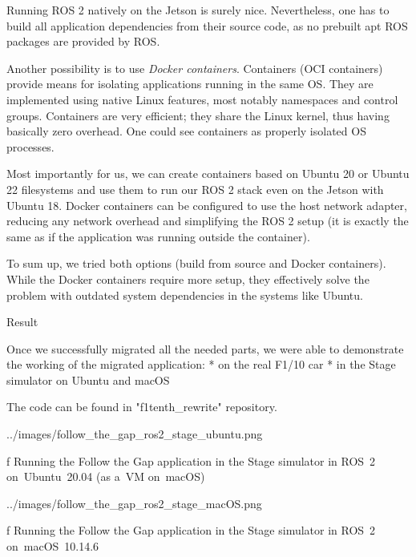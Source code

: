 Running ROS 2 natively on the Jetson is surely nice. Nevertheless, one has to build all application dependencies from their source code, as no prebuilt apt ROS packages are provided by ROS.

Another possibility is to use {\em Docker containers}. Containers (OCI containers) provide means for isolating applications running in the same OS. They are implemented using native Linux features, most notably namespaces and control groups. Containers are very efficient; they share the Linux kernel, thus having basically zero overhead. One could see containers as properly isolated OS processes.

Most importantly for us, we can create containers based on Ubuntu 20 or Ubuntu 22 filesystems and use them to run our ROS 2 stack even on the Jetson with Ubuntu 18. Docker containers can be configured to use the host network adapter, reducing any network overhead and simplifying the ROS 2 setup (it is exactly the same as if the application was running outside the container).

To sum up, we tried both options (build from source and Docker containers). While the Docker containers require more setup, they effectively solve the problem with outdated system dependencies in the systems like Ubuntu.


\sec Result

Once we successfully migrated all the needed parts, we were able to demonstrate the working of the migrated application:
\begitems
* {\sbf on the real F1/10 car}
* in the Stage simulator on Ubuntu and macOS
\enditems

The code can be found in "f1tenth_rewrite" repository.

\midinsert
{}
\picw=14cm \cinspic ../images/follow_the_gap_ros2_stage_ubuntu.png
\caption/f Running the Follow the Gap application in the Stage simulator in ROS~2 on~Ubuntu~20.04 (as a~VM on~macOS)
\endinsert

\midinsert
{}
\picw=14cm \cinspic ../images/follow_the_gap_ros2_stage_macOS.png
\caption/f Running the Follow the Gap application in the Stage simulator in ROS~2 \hbox{on~macOS~10.14.6}
\endinsert
